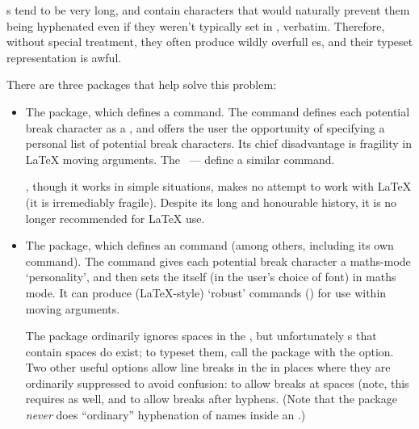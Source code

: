 
s tend to be very long, and contain characters that would
naturally prevent them being hyphenated even if they weren't typically
set in , verbatim.  Therefore, without special treatment,
they often produce wildly overfull es, and their typeset
representation is awful.

There are three packages that help solve this problem:
\begin{itemize}
\item The  package, which defines a  command.
  The command defines each potential break character as a
  , and offers the user the opportunity of
  specifying a personal list of potential break characters.  Its chief
  disadvantage is fragility in \LaTeX{} moving arguments.  The
  ~--- define a similar  command.
  
  , though it works in simple situations, makes no
  attempt to work with \LaTeX{} (it is irremediably fragile).  Despite
  its long and honourable history, it is no longer recommended for
  \LaTeX{} use.
\item The  package, which defines an  command
  (among others, including its own  command).  The command
  gives each potential break character a maths-mode `personality', and
  then sets the  itself (in the user's choice of font) in
  maths mode.  It can produce (\LaTeX{}-style) `robust' commands
  () for use
  within moving arguments.

  The package ordinarily ignores spaces in the , but
  unfortunately s that contain spaces do exist; to typeset
  them, call the package with the  option.  Two
  other useful options allow line breaks in the  in places
  where they are ordinarily suppressed to avoid confusion:
   to allow breaks at spaces (note, this requires
   as well, and  to allow
  breaks after hyphens.  (Note that the package \emph{never} does
  ``ordinary'' hyphenation of names inside an .)
  

\end{itemize}
